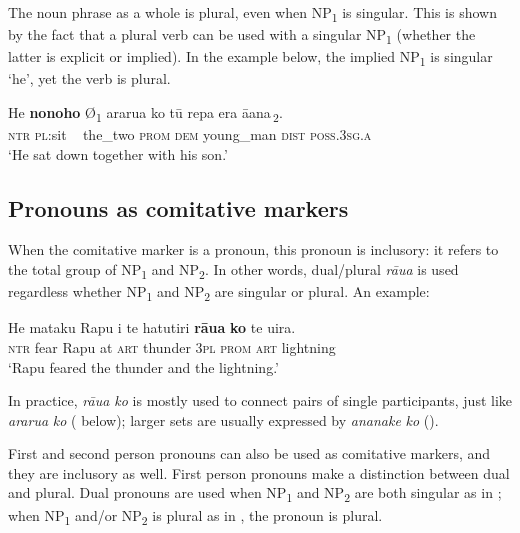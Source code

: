 The noun phrase as a whole is plural, even when NP\textsubscript{1} is singular. This is shown by the fact that a plural verb can be used with a singular NP\textsubscript{1} (whether the latter is explicit or implied). In the example below, the implied NP\textsubscript{1} is singular ‘he’, yet the verb is plural. 

\ea\label{ex:8.192}
\gll He \textbf{nonoho} \textup{Ø\textsubscript{1}} ararua ko {\ob}tū repa era {\ꞌ}ā{\ꞌ}ana\,{\cb}\textsubscript{\textup{2}}.\\
\textsc{ntr} \textsc{pl}:sit ~ the\_two \textsc{prom} {\db}\textsc{dem} young\_man \textsc{dist} \textsc{poss.3sg.a}\\

\glt 
‘He sat down together with his son.’ \textstyleExampleref{[R310.020]} 
\z

\subsection{Pronouns as comitative markers}\label{sec:8.10.2}
When the comitative marker is a pronoun, this pronoun is inclusory: it refers to the total group of NP\textsubscript{1} and NP\textsubscript{2}. In other words, dual/plural \textit{rāua} is used regardless whether NP\textsubscript{1} and NP\textsubscript{2} are singular or plural. An example:

\ea\label{ex:8.193}
\gll He mataku Rapu {\ꞌ}i te hatutiri \textbf{rāua} \textbf{ko} te {\ꞌ}uira.\\
\textsc{ntr} fear Rapu at \textsc{art} thunder \textsc{3pl} \textsc{prom} \textsc{art} lightning\\

\glt
‘Rapu feared the thunder and the lightning.’ \textstyleExampleref{[Fel-40-028]}
\z

In practice, \textit{rāua ko} is mostly used to connect pairs of single participants, just like \textit{ararua} \textit{ko} ( below); larger sets are usually expressed by \textit{ananake} \textit{ko} ().

First and second person pronouns can also be used as comitative markers, and they are inclusory as well. First person pronouns make a distinction between dual and plural. Dual pronouns are used when NP\textsubscript{1} and NP\textsubscript{2} are both singular as in ; when NP\textsubscript{1} and/or NP\textsubscript{2} is plural as in , the pronoun is plural. 

